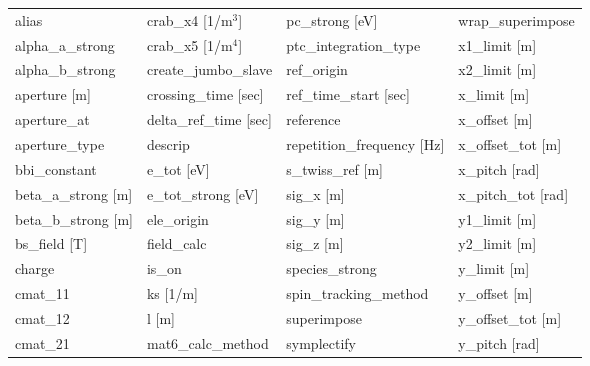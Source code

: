  \begin{tabular}{llll} \toprule
alias                            & crab_x4 [1/m$^3$]                & pc_strong [eV]                   & wrap_superimpose                 \\
alpha_a_strong                   & crab_x5 [1/m$^4$]                & ptc_integration_type             & x1_limit [m]                     \\
alpha_b_strong                   & create_jumbo_slave               & ref_origin                       & x2_limit [m]                     \\
aperture [m]                     & crossing_time [sec]              & ref_time_start [sec]             & x_limit [m]                      \\
aperture_at                      & delta_ref_time [sec]             & reference                        & x_offset [m]                     \\
aperture_type                    & descrip                          & repetition_frequency [Hz]        & x_offset_tot [m]                 \\
bbi_constant                     & e_tot [eV]                       & s_twiss_ref [m]                  & x_pitch [rad]                    \\
beta_a_strong [m]                & e_tot_strong [eV]                & sig_x [m]                        & x_pitch_tot [rad]                \\
beta_b_strong [m]                & ele_origin                       & sig_y [m]                        & y1_limit [m]                     \\
bs_field [T]                     & field_calc                       & sig_z [m]                        & y2_limit [m]                     \\
charge                           & is_on                            & species_strong                   & y_limit [m]                      \\
cmat_11                          & ks [1/m]                         & spin_tracking_method             & y_offset [m]                     \\
cmat_12                          & l [m]                            & superimpose                      & y_offset_tot [m]                 \\
cmat_21                          & mat6_calc_method                 & symplectify                      & y_pitch [rad]                    \\

\end{tabular}
